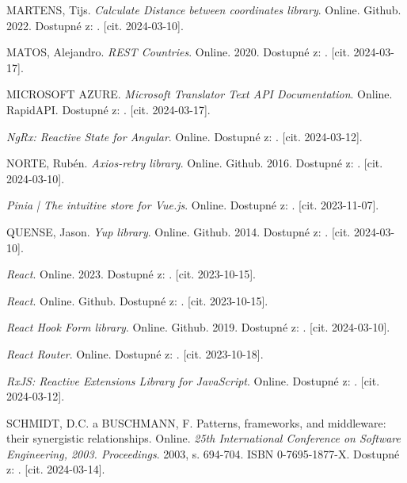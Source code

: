 \begin{thebibliography}{99}
\textsc{MARTENS}, Tijs. \emph{Calculate Distance between coordinates library}. Online. Github. 2022. Dostupné z: . [cit. 2024-03-10].

\textsc{MATOS}, Alejandro. \emph{REST Countries}. Online. 2020. Dostupné z: . [cit. 2024-03-17].

\textsc{MICROSOFT AZURE}. \emph{Microsoft Translator Text API Documentation}. Online. RapidAPI. Dostupné z: . [cit. 2024-03-17].

\emph{NgRx: Reactive State for Angular}. Online. Dostupné z: . [cit. 2024-03-12].

\textsc{NORTE}, Rubén. \emph{Axios-retry library}. Online. Github. 2016. Dostupné z: . [cit. 2024-03-10].

\emph{Pinia | The intuitive store for Vue.js}. Online. Dostupné z: . [cit. 2023-11-07].

\textsc{QUENSE}, Jason. \emph{Yup library}. Online. Github. 2014. Dostupné z: . [cit. 2024-03-10].

\emph{React}. Online. 2023. Dostupné z: . [cit. 2023-10-15].

\emph{React}. Online. Github. Dostupné z: . [cit. 2023-10-15].

\emph{React Hook Form library}. Online. Github. 2019. Dostupné z: . [cit. 2024-03-10].

\emph{React Router}. Online. Dostupné z: . [cit. 2023-10-18].

\emph{RxJS: Reactive Extensions Library for JavaScript}. Online. Dostupné z: . [cit. 2024-03-12].

\textsc{SCHMIDT}, D.C. a \textsc{BUSCHMANN}, F. Patterns, frameworks, and middleware: their synergistic relationships. Online. \emph{25th International Conference on Software Engineering, 2003. Proceedings}. 2003, s. 694-704. ISBN 0-7695-1877-X. Dostupné z: . [cit. 2024-03-14].


\end{thebibliography}
